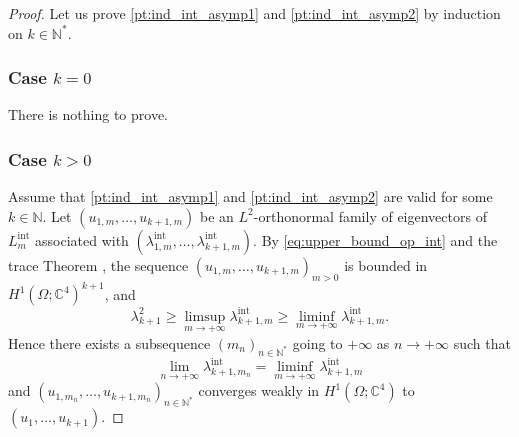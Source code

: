 \documentclass[10pt]{amsart}
\newcommand{\intt}{\mathrm{int}}
\theoremstyle{plain}
\theoremstyle{definition}
\newcommand{\CC}{\mathbb{C}}
\newcommand{\NN}{\mathbb{N}}
\begin{document}
\begin{proof}
Let us prove \eqref{pt:ind_int_asymp1} and \eqref{pt:ind_int_asymp2} by induction on $k\in \NN^*$.
\subsubsection*{Case $k\!=\!0$} There is nothing to prove.

\subsubsection*{Case $k\!>\!0$} Assume that \eqref{pt:ind_int_asymp1} and \eqref{pt:ind_int_asymp2} are valid for some $k\!\in\!\NN$. Let $(u_{1,m}, \dots, u_{k+1,m})$ be an $L^2$-orthonormal family of eigenvectors of $L_{m}^\intt$ associated with\hspace{-1.2pt} $(\lambda_{1,m}^\intt,\dots, \lambda_{k+1,m}^\intt)$. By \eqref{eq:upper_bound_op_int} and the trace Theorem \cite[\S 5.5]{evans1998partial}, the sequence $(u_{1,m}, \dots, u_{k+1,m})_{m>0}$ is bounded in $H^1(\Omega; \CC^4)^{k+1}$, and
\begin{equation}\label{eq:ineq_asymp_eigen_int}
\lambda^2_{k+1}\geq \limsup_{m\to+\infty}\lambda_{k+1,m}^\intt\geq \liminf_{m\to+\infty}\lambda_{k+1,m}^\intt.
\end{equation}
Hence there exists a subsequence $(m_n)_{n\in \NN^*}$ going to $+\infty$ as $n\to+\infty$ such that
\[
\lim_{n\to+\infty}\lambda_{k+1,m_n}^\intt = \liminf_{m\to+\infty}\lambda_{k+1,m}^\intt
\]
and $(u_{1,m_n}, \dots, u_{k+1,m_n})_{n\in \NN^*}$ converges weakly in $H^1(\Omega;\CC^4)$ to $(u_1,\dots, u_{k+1})$.


\end{proof}
\end{document}
